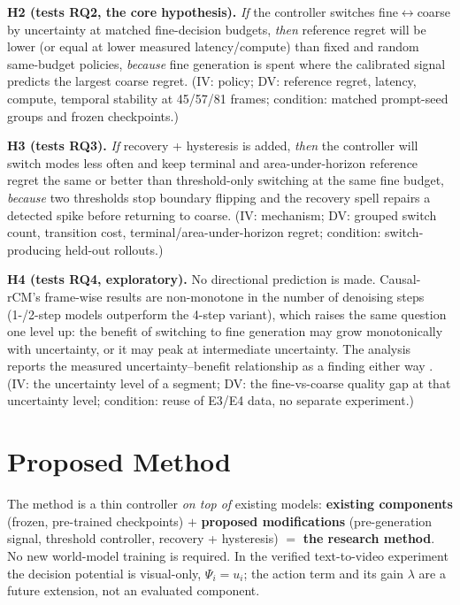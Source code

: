 \documentclass[11pt,a4paper]{article}
\begin{document}
\textbf{H2 (tests RQ2, the core hypothesis).} \emph{If} the controller switches fine$\leftrightarrow$coarse by uncertainty at matched fine-decision budgets, \emph{then} reference regret will be lower (or equal at lower measured latency/compute) than fixed and random same-budget policies, \emph{because} fine generation is spent where the calibrated signal predicts the largest coarse regret. (IV: policy; DV: reference regret, latency, compute, temporal stability at 45/57/81 frames; condition: matched prompt-seed groups and frozen checkpoints.)

\textbf{H3 (tests RQ3).} \emph{If} recovery + hysteresis is added, \emph{then} the controller will switch modes less often and keep terminal and area-under-horizon reference regret the same or better than threshold-only switching at the same fine budget, \emph{because} two thresholds stop boundary flipping and the recovery spell repairs a detected spike before returning to coarse. (IV: mechanism; DV: grouped switch count, transition cost, terminal/area-under-horizon regret; condition: switch-producing held-out rollouts.)

\textbf{H4 (tests RQ4, exploratory).} No directional prediction is made. Causal-rCM's frame-wise results are non-monotone in the number of denoising steps (1-/2-step models outperform the 4-step variant), which raises the same question one level up: the benefit of switching to fine generation may grow monotonically with uncertainty, or it may peak at intermediate uncertainty. The analysis reports the measured uncertainty--benefit relationship as a finding either way \parencite{zhengCausalrCMUnifiedTeacherForcing2026}. (IV: the uncertainty level of a segment; DV: the fine-vs-coarse quality gap at that uncertainty level; condition: reuse of E3/E4 data, no separate experiment.)

\section{Proposed Method}\label{sec:method}

The method is a thin controller \emph{on top of} existing models: \textbf{existing components} (frozen, pre-trained checkpoints) $+$ \textbf{proposed modifications} (pre-generation signal, threshold controller, recovery + hysteresis) $=$ \textbf{the research method}. No new world-model training is required. In the verified text-to-video experiment the decision potential is visual-only, $\Psi_i=u_i$; the action term and its gain $\lambda$ are a future extension, not an evaluated component.
\end{document}
